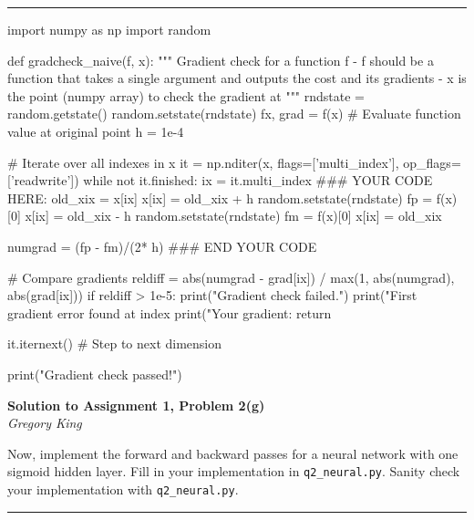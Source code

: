 \documentclass[letter,12pt]{article}
\newcommand{\myhwtitle}[3]
{\begin{center}
{\large {\bf Solution to Assignment {#1}, Problem {#2}}}\\
\medskip 
{\it {#3}} %
\end{center}}
\begin{document}
\noindent\rule{\textwidth}{0.4pt}
\begin{python}
import numpy as np
import random

def gradcheck_naive(f, x):
    """ 
    Gradient check for a function f 
    - f should be a function that takes a single argument and
      outputs the cost and its gradients
    - x is the point (numpy array) to check the gradient at
    """ 
    rndstate = random.getstate()
    random.setstate(rndstate)  
    fx, grad = f(x) # Evaluate function value at original point
    h = 1e-4

    # Iterate over all indexes in x
    it = np.nditer(x, flags=['multi_index'], op_flags=['readwrite'])
    while not it.finished:
        ix = it.multi_index
        ### YOUR CODE HERE:
        old_xix = x[ix]
        x[ix] = old_xix + h
        random.setstate(rndstate)
        fp = f(x)[0]
        x[ix] = old_xix - h
        random.setstate(rndstate)
        fm = f(x)[0]
        x[ix] = old_xix

        numgrad = (fp - fm)/(2* h)
        ### END YOUR CODE

        # Compare gradients
        reldiff = abs(numgrad - grad[ix]) / max(1, abs(numgrad), abs(grad[ix]))
        if reldiff > 1e-5:
            print("Gradient check failed.")
            print("First gradient error found at index %
            print("Your gradient: %
            return
    
        it.iternext() # Step to next dimension

    print("Gradient check passed!")
\end{python}
\clearpage
\myhwtitle{1}{2(g)}{Gregory King}
\bigskip
\noindent  Now, implement the forward and backward passes for a neural network with one sigmoid
hidden layer. Fill in your implementation in \texttt{q2\_neural.py}. Sanity check your implementation with
\texttt{q2\_neural.py}. \\
\noindent\rule{\textwidth}{0.4pt}
\end{document}
